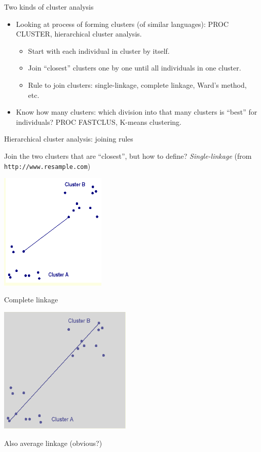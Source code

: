 \documentclass[pdf]{prosper}
\begin{document}
\begin{slide}{Two kinds of cluster analysis}

  \begin{itemize}
  \item Looking at process of forming clusters (of similar languages): PROC CLUSTER, hierarchical cluster analysis.
    \begin{itemize}
    \item Start with each individual in cluster by itself.
    \item Join ``closest'' clusters one by one until all individuals in one cluster.
    \item Rule to join clusters: single-linkage, complete linkage, Ward's method, etc.
    \end{itemize}
  \item Know how many clusters: which division into that many clusters is ``best'' for individuals? PROC FASTCLUS, K-means clustering.
  \end{itemize}
  
\end{slide}

\begin{slide}{Hierarchical cluster analysis: joining rules}

  Join the two clusters that are ``closest'', but how to define? {\em
    Single-linkage} (from \verb-http://www.resample.com-)

  \includegraphics[width=2in]{single-linkage}
  
\end{slide}

\begin{slide}{Complete linkage}

\includegraphics[width=2.5in]{complete-linkage}

Also average linkage (obvious?)
  
\end{slide}
\end{document}
